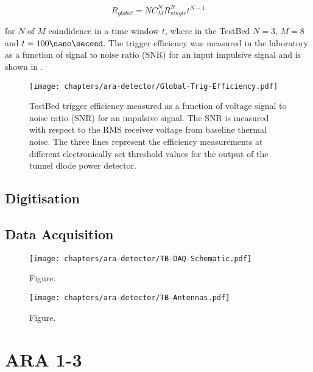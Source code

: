 \begin{equation}
  R_{global} = N C^{N}_{M}R_{single}^{N}t^{N-1}
  \label{eq:ara-detector:TestBed:Trigger-Rate}
\end{equation}

\noindent for $N$ of $M$ coindidence in a time window $t$, where in the TestBed $N=3$, $M=8$ and $t=100\nano\second$. The trigger efficiency was measured in the laboratory as a function of signal to noise ratio (SNR) for an input impulsive signal and is shown in .

\begin{figure}[htpb]
  \centering
  \texttt{[image: chapters/ara-detector/Global-Trig-Efficiency.pdf]}
  \caption{TestBed trigger efficiency measured as a function of voltage signal to noise ratio (SNR) for an impulsive signal. The SNR is measured with respect to the RMS receiver voltage from baseline thermal noise. The three lines represent the efficiency measurements at different electronically set threshold values for the output of the tunnel diode power detector.}
  \label{fig:ara-detector:TestBed:Trigger-Efficiency}
\end{figure}


\subsection{Digitisation}
\label{sec:ara-detector:TestBed:Digitisation}

\subsection{Data Acquisition}
\label{sec:ara-detector:TestBed:Data-Acquisition}

\begin{figure}[htpb]
  \centering
  \texttt{[image: chapters/ara-detector/TB-DAQ-Schematic.pdf]}
  \caption{Figure.}
  \label{fig:ara-detector:TestBed:DAQ-Schematic}
\end{figure}

\begin{figure}[htpb]
  \centering
  \texttt{[image: chapters/ara-detector/TB-Antennas.pdf]}
  \caption{Figure.}
  \label{fig:ara-detector:TestBed:Antennas}
\end{figure}





\section{ARA 1-3}
\label{sec:ara-detector:ARA1-3}



